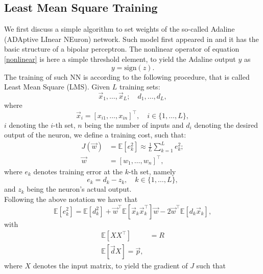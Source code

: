 \documentclass[%
    corpo=11pt,
    twoside,
    stile=classica,
    oldstyle,
    autoretitolo,
    tipotesi=magistrale,
    greek,
    evenboxes,
    english
]{toptesi}
\newcommand{\sign}{\text{sign}}
\begin{document}
\subsection{Least Mean Square Training}
We first discuss a simple algorithm to set weights of the so-called Adaline (ADAptive LInear NEuron) network. Such model first appeared in \cite{widrow} and it has the basic structure of a bipolar perceptron. The nonlinear operator of equation \eqref{nonlinear} is here a simple threshold element, to yield the Adaline output $y$ as
\begin{equation}
y = \sign(z).
\end{equation}
The training of such NN is according to the following procedure, that is called Least Mean Square (LMS). Given $L$ training sets:
\begin{equation}
\vec{x}_1,\dots,\vec{x}_L; \quad d_1, \dots, d_L,
\end{equation}
where
\begin{equation}
\vec{x}_i = \left[x_{i1}, \dots, x_{in} \right]^\intercal, \quad i \in \{1,\dots, L\},
\end{equation}
$i$ denoting the $i$-th set, $n$ being the number of inputs and $d_i$ denoting the desired output of the neuron, we define a training cost, such that:
\begin{align}
J(\vec{w}) &= \mathbb{E}\left[ e_k^2\right] \approx \frac{1}{L}\sum_{k=1}^{L}e_k^2; \label{trainingcost} \\
\vec{w} &= \left[w_{1}, \dots, w_{n} \right]^\intercal,
\end{align}
where $e_k$ denotes training error at the $k$-th set, namely
\begin{equation}
e_k = d_k - z_k, \quad k \in \{1,\dots, L\},
\end{equation}
and $z_k$ being the neuron's actual output. \\
Following the above notation we have that 
\begin{equation}
\mathbb{E}\left[e_k^2\right] = \mathbb{E}\left[d_k^2\right] + \vec{w}^{\intercal}\mathbb{E}\left[\vec{x}_k\vec{x}_k^{\intercal}\right]\vec{w} - 2\vec{w}^{\intercal}\mathbb{E}\left[d_k\vec{x}_k\right],
\end{equation}
with
\begin{align}
\mathbb{E}\left[XX^{\intercal} \right] &= R \label{expectdesign}\\
\mathbb{E}\left[\vec{d}X\right] = \vec{p},
\end{align}
where $X$ denotes the input matrix, to yield the gradient of $J$ such that
\end{document}
